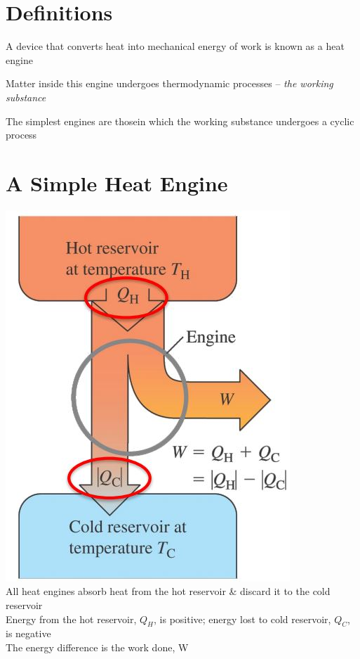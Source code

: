 \documentclass[a4paper, 11pt, normalem]{report}
\begin{document}
\section{Definitions}
A device that converts heat into mechanical energy of work is known as a heat engine

Matter inside this engine undergoes thermodynamic processes -- \emph{the working substance}

The simplest engines are thosein which the working substance undergoes a cyclic process

\section{A Simple Heat Engine}
\includegraphics[scale=0.7]{HeatEngine.jpg} \\
All heat engines absorb heat from the hot reservoir \& discard it to the cold reservoir \\
Energy from the hot reservoir, $Q_{H}$, is positive; energy lost to cold reservoir, $Q_{C}$, is negative \\
The energy difference is the work done, W
\end{document}
